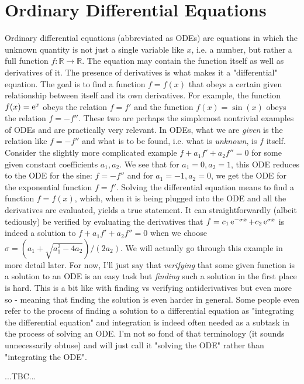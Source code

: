 \section{Ordinary Differential Equations} 
Ordinary differential equations (abbreviated as ODEs) are equations in which the unknown quantity is not just a single variable like $x$, i.e. a number, but rather a full function $f:\mathbb{R} \rightarrow \mathbb{R}$. The equation may contain the function itself as well as derivatives of it. The presence of derivatives is what makes it a "differential" equation. The goal is to find a function $f = f(x)$ that obeys a certain given relationship between itself and its own derivatives. For example, the function $f(x) = \operatorname{\mathrm{e}}^x$ obeys the relation $f = f'$ and the function $f(x) = \sin (x)$ obeys the relation $f = -f''$. These two are perhaps the simplemost nontrivial examples of ODEs and are practically very relevant. In ODEs, what we are \emph{given} is the relation like $f = -f''$ and what is to be found, i.e. what is \emph{unknown}, is $f$ itself. Consider the slightly more complicated example $f + a_1 f' + a_2 f'' = 0$ for some given constant coefficients $a_1, a_2$. We see that for $a_1 = 0, a_2 = 1$, this ODE reduces to the ODE for the sine: $f = -f''$ and for $a_1 = -1, a_2 = 0$, we get the ODE for the exponential function $f = f'$. Solving the differential equation means to find a function $f = f(x)$, which, when it is being plugged into the ODE and all the derivatives are evaluated, yields a true statement. It can straightforwardly (albeit tediously) be verified by evaluating the derivatives that $f = c_1 \operatorname{\mathrm{e}}^{-\sigma x} + c_2 \operatorname{\mathrm{e}}^{\sigma x}$ is indeed a solution to $f + a_1 f' + a_2 f'' = 0$ when we choose $\sigma = (a_1 + \sqrt{a_1^2 - 4 a_2})/(2 a_2)$. We will actually go through this example in more detail later. For now, I'll just say that \emph{verifying} that some given function is a solution to an ODE is an easy task but \emph{finding} such a solution in the first place is hard. This is a bit like with finding vs verifying antiderivatives but even more so - meaning that finding the solution is even harder in general. Some people even refer to the process of finding a solution to a differential equation as "integrating the differential equation" and integration is indeed often needed as a subtask in the process of solving an ODE. I'm not so fond of that terminology (it sounds unnecessarily obtuse) and will just call it "solving the ODE" rather than "integrating the ODE".

...TBC...

